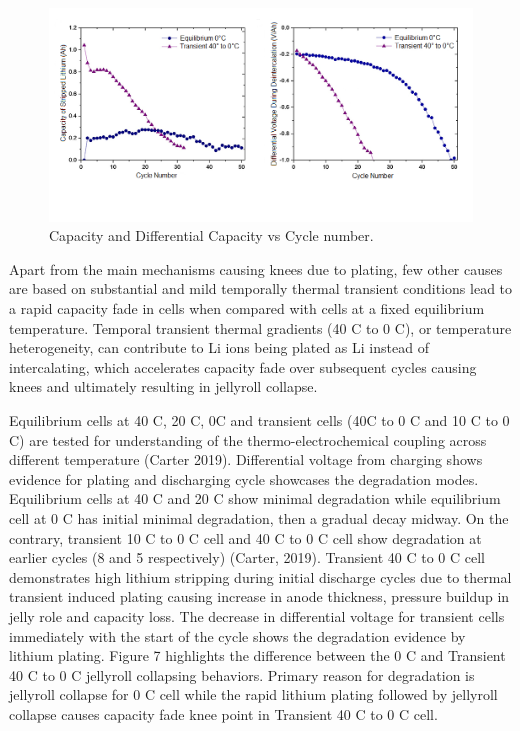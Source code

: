 \documentclass[journal=jpcl, manuscript=article, layout=onecolumn]{achemso}
\begin{document}
\begin{figure}[ht]
\centering
\includegraphics[scale = 0.6]{images/Capacity & Diff Voltage.png}
\caption{Capacity and Differential Capacity vs Cycle number.}
\label{fig:CapDiffCapCycle}
\end{figure}

Apart from the main mechanisms causing knees due to plating, few other causes are based on substantial and mild temporally thermal transient conditions lead to a rapid capacity fade in cells when compared with cells at a fixed equilibrium temperature. Temporal transient thermal gradients (40 \degree C to 0 \degree C), or temperature heterogeneity, can contribute to Li ions being plated as Li instead of intercalating, which accelerates capacity fade over subsequent cycles causing knees and ultimately resulting in jellyroll collapse.

Equilibrium cells at 40 \degree C, 20 \degree C, 0\degree C and transient cells (40\degree C to 0 \degree C and 10 \degree C to 0 \degree C) are tested for understanding of the thermo-electrochemical coupling across different temperature (Carter 2019). Differential voltage from charging shows evidence for plating and discharging cycle showcases the degradation modes. Equilibrium cells at 40 \degree C and 20 \degree C show minimal degradation while equilibrium cell at 0 \degree C has initial minimal degradation, then a gradual decay midway. On the contrary, transient 10 \degree C to 0 \degree C cell and 40 \degree C to 0 \degree C cell show degradation at earlier cycles (8 and 5 respectively) (Carter, 2019). Transient 40 \degree C to 0 \degree C cell demonstrates high lithium stripping during initial discharge cycles due to thermal transient induced plating causing increase in anode thickness, pressure buildup in jelly role and capacity loss. The decrease in differential voltage for transient cells immediately with the start of the cycle shows the degradation evidence by lithium plating.  Figure 7 highlights the difference between the 0 \degree C and Transient 40 \degree C to 0 \degree C jellyroll collapsing behaviors. Primary reason for degradation is jellyroll collapse for 0 \degree C cell while the rapid lithium plating followed by jellyroll collapse causes capacity fade knee point in Transient 40 \degree C to 0 \degree C cell. 
\end{document}
